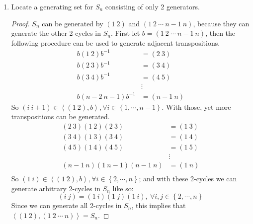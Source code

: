 \documentclass{article}
\newcommand{\parens}[1]{\left(#1\right)}
\newcommand{\bracks}[1]{\left\{#1\right\}}
\newcommand{\abracks}[1]{\left< #1\right>}
\begin{document}
\begin{enumerate}[(H1)]
\begin{proof}
\begin{align*}
\varphi\parens{\tau_1\tau_2} &= \tau_1\tau_2 \\
&= \sigma\sigma\tau_1\tau_2 \\ 
&= \sigma\tau_1\sigma\tau_2 \\
&= \varphi\parens{\tau_1}\varphi\parens{\tau_2}
\end{align*}        
$\tau_1\tau_2 \in B_n$:\\
Suppose that $\tau_1$ is even and $\tau_2$ is odd, then
\begin{align*}
\varphi\parens{\tau_1\tau_2} &= \sigma\tau_1\tau_2 \\ 
&= \tau_1\sigma\tau_2 \\ 
&= \varphi\parens{\tau_1}\varphi\parens{\tau_2}
\end{align*}
By symmetry, we may conclude that the property is respected when
swapping the parities of $\tau_1$ and $\tau_2$, as well.
So, $\varphi$ is a bijective map with the homomorphism property and 
$S_n \cong Q \subset A_{n+2}$.
\end{proof}


\item 
Locate a generating set for $S_n$ consisting of only 2 generators.  
\begin{proof}
$S_n$ can be generated by $(1\ 2)$ and $(1\ 2\ \cdots\ n-1\ n)$, 
because they can generate the other 2-cycles in $S_n$. First let $b = 
(1\ 2\ \cdots\ n-1\ n)$, then the following procedure can be used to
generate adjacent transpositions.
\begin{align*}
b\parens{1\ 2}b^{-1} &= (2\ 3) \\
b\parens{2\ 3}b^{-1} &= (3\ 4) \\
b\parens{3\ 4}b^{-1} &= (4\ 5) \\
&\vdots \\
b\parens{n-2\ n-1}b^{-1} &= (n-1\ n)
\end{align*}
So $(i\ i+1) \in \abracks{(1\ 2),b}, \forall i \in \bracks{1, \cdots,
n-1}$. With those, yet more transpositions can be generated.
\begin{align*}
(2\ 3)(1\ 2)(2\ 3) &= (1\ 3) \\
(3\ 4)(1\ 3)(3\ 4) &= (1\ 4) \\
(4\ 5)(1\ 4)(4\ 5) &= (1\ 5) \\
&\vdots \\
(n-1\ n)(1\ n-1)(n-1\ n) &= (1\ n) \\
\end{align*}
So $(1\ i) \in \abracks{(1\ 2),b}, \forall i \in \bracks{2, \cdots,
n}$; and with these 2-cycles we can generate arbitrary 2-cycles in 
$S_n$ like so:
$$(i\ j) = (1\ i)(1\ j)(1\ i),\ \forall i,j \in \bracks{2,\cdots,n}$$
Since we can generate all 2-cycles in $S_n$, this implies that 
$\abracks{(1\ 2), (1\ 2\ \cdots\ n)} = S_n$. 


\end{proof}
\end{enumerate}
\end{document}
